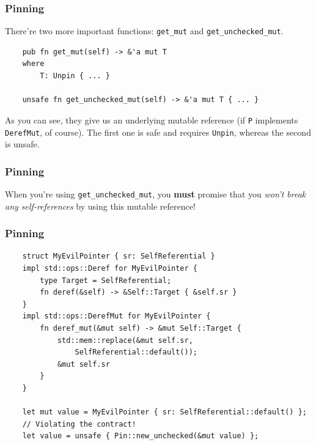 \documentclass[aspectratio=1610,t]{beamer}
\begin{document}

\begin{frame}[fragile]
\frametitle{Pinning}
There're two more important functions: \texttt{get\_mut} and \texttt{get\_unchecked\_mut}.

\begin{verbatim}
    pub fn get_mut(self) -> &'a mut T
    where
        T: Unpin { ... }
    
    unsafe fn get_unchecked_mut(self) -> &'a mut T { ... }
\end{verbatim}

As you can see, they give us an underlying mutable reference (if \texttt{P} implements \texttt{DerefMut}, of course). The first one is safe and requires \texttt{Unpin}, whereas the second is unsafe.
\end{frame}


\begin{frame}[fragile]
\frametitle{Pinning}
When you're using \texttt{get\_unchecked\_mut}, you \textbf{must} promise that you \textit{won't break any self-references} by using this mutable reference!

\end{frame}


\begin{frame}[fragile]
\frametitle{Pinning}
\begin{verbatim}
    struct MyEvilPointer { sr: SelfReferential }
    impl std::ops::Deref for MyEvilPointer {
        type Target = SelfReferential;
        fn deref(&self) -> &Self::Target { &self.sr }
    }
    impl std::ops::DerefMut for MyEvilPointer {
        fn deref_mut(&mut self) -> &mut Self::Target {
            std::mem::replace(&mut self.sr,
                SelfReferential::default());
            &mut self.sr
        }
    }

    let mut value = MyEvilPointer { sr: SelfReferential::default() };
    // Violating the contract!
    let value = unsafe { Pin::new_unchecked(&mut value) };
\end{verbatim}
\end{frame}
\end{document}
